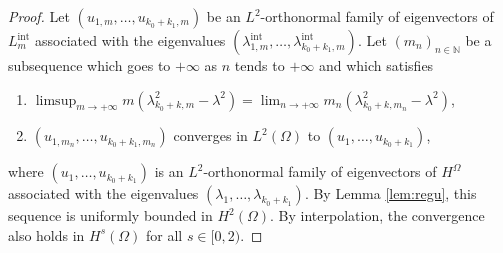 \documentclass[JEP,XML,SOM,Unicode]{cedram}
\newcommand{\intt}{\mathrm{int}}
\theoremstyle{plain}
\theoremstyle{definition}
\newcommand{\NN}{\mathbb{N}}
\begin{document}
\begin{proof}
Let $(u_{1,m}, \dots,u_{k_0+k_1,m})$ be an $L^2$-orthonormal family of eigenvectors of $L^\intt_m$ associated with the eigenvalues $(\lambda^\intt_{1,m},\dots,\lambda^\intt_{k_0+k_1,m})$.
Let $(m_n)_{n\in \NN}$ be a subsequence which goes to $+\infty$ as $n$ tends to $+\infty$ and which satisfies
\begin{enumerate}
\item $\limsup_{m\to+\infty}m(\lambda_{k_0+k,m}^2-\lambda^2) = \lim_{n\to+\infty}m_n(\lambda_{k_0+k,m_n}^2-\lambda^2)$,
\item $(u_{1,m_n},\dots,u_{k_0+k_1,m_n})$ converges in $L^2(\Omega)$ to $(u_1,\dots,u_{k_0+k_1})$,
\end{enumerate}
where $(u_1,\dots,u_{k_0+k_1})$ is an $L^2$-orthonormal family of eigenvectors of $H^\Omega$ associated with the eigenvalues $(\lambda_1,\dots,\lambda_{k_0+k_1})$.
By Lemma \ref{lem:regu}, this sequence is uniformly bounded in $H^2(\Omega)$. By interpolation, the convergence also holds in $H^s(\Omega)$ for all $s\in[0,2)$.


\end{proof}
\end{document}
